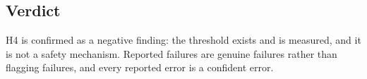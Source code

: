 \subsection{Verdict}

H4 is confirmed as a negative finding: the threshold exists and is measured, and it
is not a safety mechanism. Reported failures are genuine failures rather than
flagging failures, and every reported error is a confident error.
